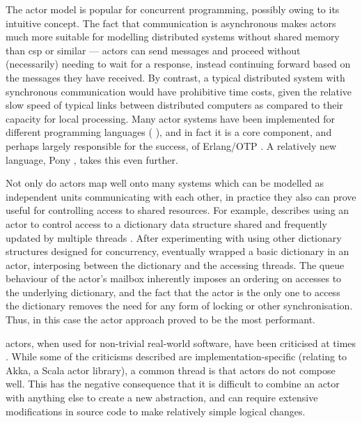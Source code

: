 The \Gls{actor} model is popular for concurrent programming, possibly owing to its intuitive concept.  The fact that communication is asynchronous makes \glspl{actor} much more suitable for modelling distributed systems without shared memory than \gls{csp} or similar --- \glspl{actor} can send messages and proceed without (necessarily) needing to wait for a response, instead continuing forward based on the messages they have received.  By contrast, a typical distributed system with synchronous communication would have prohibitive time costs, given the relative slow speed of typical links between distributed computers as compared to their capacity for local processing.  Many \Gls{actor} systems have been implemented for different programming languages (\eg{} \cite{Varela2001,Srinivasan2008,Charousset2016,Bernstein2016}), and in fact it is a core component, and perhaps largely responsible for the success, of Erlang/OTP \cite{Armstrong2010,Armstrong2013,Vinoski2012}.  A relatively new language, Pony \cite{Clebsch2015,Clebsch2017}, takes this even further.

Not only do \glspl{actor} map well onto many systems which can be modelled as independent units communicating with each other, in practice they also can prove useful for controlling access to shared resources.  For example, \citeauthor{Terrell2018} describes using an \gls{actor} to control access to a dictionary data structure shared and frequently updated by multiple threads \cite{Terrell2018}.  After experimenting with using other dictionary structures designed for concurrency, \citeauthor{Terrell2018} eventually wrapped a basic dictionary in an \gls{actor}, interposing between the dictionary and the accessing threads.  The queue behaviour of the \gls{actor}'s mailbox inherently imposes an ordering on accesses to the underlying dictionary, and the fact that the \gls{actor} is the only one to access the dictionary removes the need for any form of locking or other synchronisation.  Thus, in this case the \Gls{actor} approach proved to be the most performant.

\Glspl{actor}, when used for non-trivial real-world software, have been criticised at times \cite{Welsh2013,Stucchio2013}.  While some of the criticisms described are implementation-specific (relating to Akka, a Scala \gls{actor} library), a common thread is that \glspl{actor} do not compose well.  This has the negative consequence that it is difficult to combine an \gls{actor} with anything else to create a new abstraction, and can require extensive modifications in source code to make relatively simple logical changes.

